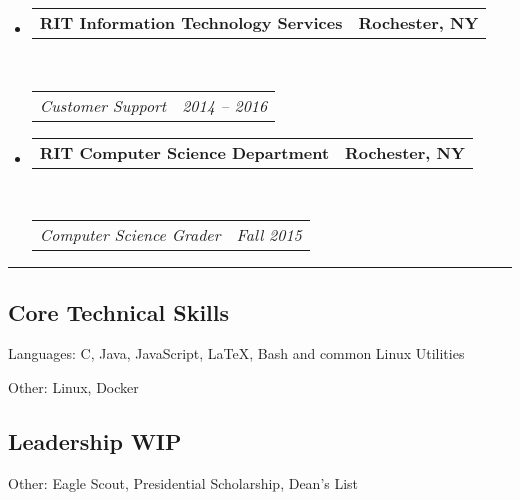 \documentclass[10pt, letterpaper]{article}
\makeatletter
\newenvironment{indentsection}[1]%
{\begin{list}{}%
	{\setlength{\leftmargin}{#1}}%
	\item[]%
}
{\end{list}}
\newcommand{\headerrow}[2]
{\begin{tabular*}{\linewidth}{l@{\extracolsep{\fill}}r}
	#1 &
	#2 \\
\end{tabular*}}
\newcommand{\CPP}
{C\nolinebreak[4]\hspace{-.05em}\raisebox{.22ex}{\footnotesize\bf ++}}
\makeatother
\begin{document}
\begin{itemize}
	\item
	\headerrow
		{\textbf{RIT Information Technology Services}}
		{\textbf{Rochester, NY}}
	\\
	\headerrow
		{\emph{Customer Support}}
		{\emph{2014 -- 2016}}

	\item
	\headerrow
		{\textbf{RIT Computer Science Department}}
		{\textbf{Rochester, NY}}
	\\
	\headerrow
		{\emph{Computer Science Grader}}
		{\emph{Fall 2015}}

\end{itemize}

\hrule
\vspace{-0.4em}

\subsection*{Core Technical Skills}
\begin{indentsection}{\parindent}
\begin{description*}
	\item[Languages:]
	\CPP, Java, JavaScript, \LaTeX, Bash and common Linux Utilities
	\item[Other:]
	Linux, Docker
\end{description*}
\end{indentsection}

\subsection*{Leadership WIP}
\begin{indentsection}{\parindent}
\begin{description*}
	\item[Other:]
	Eagle Scout, Presidential Scholarship, Dean's List
\end{description*}
\end{indentsection}
\end{document}
